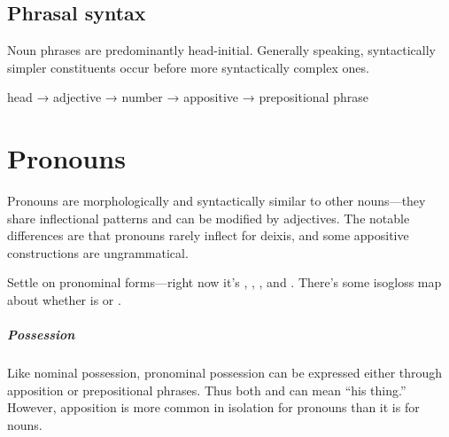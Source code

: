 
\section{Phrasal syntax}
Noun phrases are predominantly head-initial. Generally speaking, syntactically simpler constituents occur before more syntactically complex ones.

\begin{example}
    head → adjective → number → appositive → prepositional phrase
\end{example}

\setchapterpreamble[u]{\margintoc}
\chapter{Pronouns}
Pronouns are morphologically and syntactically similar to other nouns---they share inflectional patterns and can be modified by adjectives. The notable differences are that pronouns rarely inflect for deixis, and some appositive constructions are ungrammatical.

\begin{kaobox}[frametitle=\sc todo:]
Settle on pronominal forms---right now it's  ,  ,  , and  . There's some isogloss map about whether  is  or .
\end{kaobox}

\paragraph{Possession}
Like nominal possession, pronominal possession can be expressed either through apposition or prepositional phrases.  Thus both  and  can mean “his thing.” However, apposition is more common in isolation for pronouns than it is for nouns.
